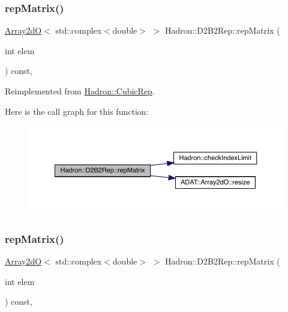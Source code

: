 \subsubsection{\texorpdfstring{repMatrix()}{repMatrix()}\hspace{0.1cm}{\footnotesize\ttfamily [1/3]}}
{\footnotesize\ttfamily \mbox{\hyperlink{classADAT_1_1Array2dO}{Array2dO}}$<$ std\+::complex$<$double$>$ $>$ Hadron\+::\+D2\+B2\+Rep\+::rep\+Matrix (\begin{DoxyParamCaption}\item[{int}]{elem }\end{DoxyParamCaption}) const\hspace{0.3cm}{\ttfamily [inline]}, {\ttfamily [virtual]}}



Reimplemented from \mbox{\hyperlink{structHadron_1_1CubicRep_ac5d7e9e6f4ab1158b5fce3e4ad9e8005}{Hadron\+::\+Cubic\+Rep}}.

Here is the call graph for this function\+:
\nopagebreak
\begin{figure}[H]
\begin{center}
\leavevmode
\includegraphics[width=350pt]{d3/dbb/structHadron_1_1D2B2Rep_a0e46bb79c1d9429a207f9f82eef59450_cgraph}
\end{center}
\end{figure}
\mbox{\label{structHadron_1_1D2B2Rep_a0e46bb79c1d9429a207f9f82eef59450}} 
\subsubsection{\texorpdfstring{repMatrix()}{repMatrix()}\hspace{0.1cm}{\footnotesize\ttfamily [2/3]}}
{\footnotesize\ttfamily \mbox{\hyperlink{classADAT_1_1Array2dO}{Array2dO}}$<$ std\+::complex$<$double$>$ $>$ Hadron\+::\+D2\+B2\+Rep\+::rep\+Matrix (\begin{DoxyParamCaption}\item[{int}]{elem }\end{DoxyParamCaption}) const\hspace{0.3cm}{\ttfamily [inline]}, {\ttfamily [virtual]}}



